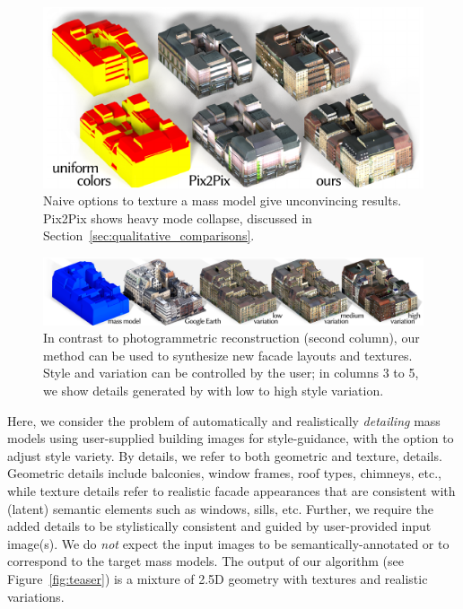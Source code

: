 \begin{figure}[t!]
    \centering
    \includegraphics[width=\columnwidth]{images/intro_naive.pdf}
    \vspace{-10pt}
    \caption{Naive options to texture a mass model give unconvincing results. Pix2Pix shows heavy mode collapse, discussed in Section~\ref{sec:qualitative_comparisons}.}
    \label{fig:intro_naive}
    \vspace{-5pt}
\end{figure}


\begin{figure}[t!]
    \centering
    \includegraphics[width=\textwidth]{images/style_variation_teaser.pdf}
    \caption{In contrast to photogrammetric reconstruction (second column), our method can be used to synthesize new facade layouts and textures. Style and variation can be controlled by the user; in columns 3 to 5, we show details generated by \systemName with low to high style variation.}
    \label{fig:photogrammetric}
\end{figure}

Here, we consider the problem of automatically and realistically {\em detailing} mass models using user-supplied building images for style-guidance, with the option to adjust style variety. By details, we refer to both geometric and texture, details. Geometric details include balconies, window frames, roof types, chimneys, etc., while texture details refer to realistic facade appearances that are consistent with (latent) semantic elements such as windows, sills, etc. Further, we require the added details to be stylistically consistent and guided by user-provided input image(s). We do {\em not} expect the input images to be semantically-annotated or to correspond to the target mass models. 
%
The output of our algorithm (see Figure~\ref{fig:teaser}) is a mixture of 2.5D geometry with textures and realistic variations.

